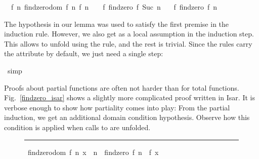 \begin{isabellebody}
\begin{isamarkuptxt}
  \begin{isabelle}%
\ {}{\isachardot}\ {\isasymAnd}f\ n{\isachardot}\ {\isasymlbrakk}findzero{\isacharunderscore}dom\ {\isacharparenleft}f{\isacharcomma}\ n{\isacharparenright}{\isacharsemicolon}\ f\ n\ {\isasymnoteq}\ {}\ {\isasymLongrightarrow}\ f\ {\isacharparenleft}findzero\ f\ {\isacharparenleft}Suc\ n{\isacharparenright}{\isacharparenright}\ {\isacharequal}\ {}{\isasymrbrakk}\isanewline
{}\ f\ {\isacharparenleft}findzero\ f\ n{\isacharparenright}\ {\isacharequal}\ {}%
\end{isabelle}

  \noindent The hypothesis in our lemma was used to satisfy the first premise in
  the induction rule. However, we also get  as a local assumption in the induction step. This
  allows to unfold  using the 
  rule, and the rest is trivial. Since the  rules carry the
   attribute by default, we just need a single step:%
\end{isamarkuptxt}%
\isamarkuptrue%
\isamarkupfalse%
\ simp\isanewline
{}\isamarkupfalse%
%
\endisatagproof
{\isafoldproof}%
%
\isadelimproof
%
\endisadelimproof
%
\begin{isamarkuptext}%
Proofs about partial functions are often not harder than for total
  functions. Fig.~\ref{findzero_isar} shows a slightly more
  complicated proof written in Isar. It is verbose enough to show how
  partiality comes into play: From the partial induction, we get an
  additional domain condition hypothesis. Observe how this condition
  is applied when calls to  are unfolded.%
\end{isamarkuptext}%
\isamarkuptrue%
%
\begin{figure}
\hrule\vspace{6pt}
\begin{minipage}{0.8\textwidth}
\isastyle\isamarkuptrue
{}\isamarkupfalse%
\ {\isachardoublequoteopen}{\isasymlbrakk}findzero{\isacharunderscore}dom\ {\isacharparenleft}f{\isacharcomma}\ n{\isacharparenright}{\isacharsemicolon}\ x\ {\isasymin}\ {\isacharbraceleft}n\ {\isachardot}{\isachardot}{\isacharless}\ findzero\ f\ n{\isacharbraceright}{\isasymrbrakk}\ {\isasymLongrightarrow}\ f\ x\ {\isasymnoteq}\ {}{\isachardoublequoteclose}\isanewline

\end{minipage}
\end{figure}
\end{isabellebody}
